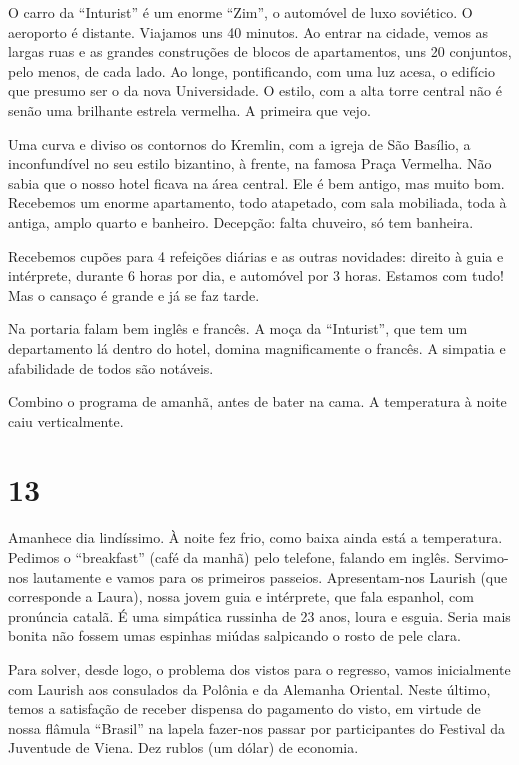 O carro da ``Inturist'' é um enorme ``Zim'', o automóvel de luxo soviético. O aeroporto é distante. Viajamos uns 40 minutos. Ao entrar na cidade, vemos as largas ruas e as grandes construções de blocos de apartamentos, uns 20 conjuntos, pelo menos, de cada lado. Ao longe, pontificando, com uma luz acesa, o edifício que presumo ser o da nova Universidade. O estilo, com a alta torre central não é senão uma brilhante estrela vermelha. A primeira que vejo.

Uma curva e diviso os contornos do Kremlin, com a igreja de São Basílio, a inconfundível no seu estilo bizantino, à frente, na famosa Praça Vermelha. Não sabia que o nosso hotel ficava na área central. Ele é bem antigo, mas muito bom. Recebemos um enorme apartamento, todo atapetado, com sala mobiliada, toda à antiga, amplo quarto e banheiro. Decepção: falta chuveiro, só tem banheira.

Recebemos cupões para 4 refeições diárias e as outras novidades: direito à guia e intérprete, durante 6 horas por dia, e automóvel por 3 horas. Estamos com tudo! Mas o cansaço é grande e já se faz tarde.

Na portaria falam bem inglês e francês. A moça da ``Inturist'', que tem um departamento lá dentro do hotel, domina magnificamente o francês. A simpatia e afabilidade de todos são notáveis.

Combino o programa de amanhã, antes de bater na cama. A temperatura à noite caiu verticalmente.

\section*{13 \adfflatleafright {}}
Amanhece dia lindíssimo. À noite fez frio, como baixa ainda está a temperatura. Pedimos o ``breakfast'' (café da manhã) pelo telefone, falando em inglês. Servimo-nos lautamente e vamos para os primeiros passeios. Apresentam-nos Laurish (que corresponde a Laura), nossa jovem guia e intérprete, que fala espanhol, com pronúncia catalã. É uma simpática russinha de 23 anos, loura e esguia. Seria mais bonita não fossem umas espinhas miúdas salpicando o rosto de pele clara.

Para solver, desde logo, o problema dos vistos para o regresso, vamos inicialmente com Laurish aos consulados da Polônia e da Alemanha Oriental. Neste último, temos a satisfação de receber dispensa do pagamento do visto, em virtude de nossa flâmula ``Brasil'' na lapela fazer-nos passar por participantes do Festival da Juventude de Viena. Dez rublos (um dólar) de economia.

